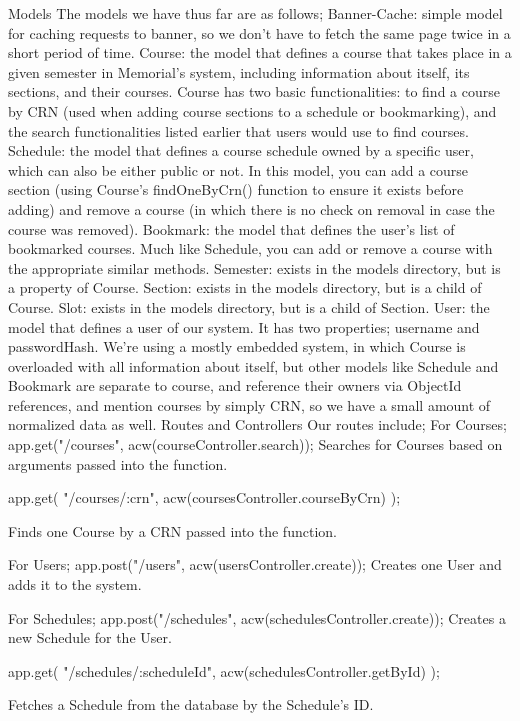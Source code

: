 \documentclass[12pt]{article}
\begin{document}
Models
The models we have thus far are as follows; 
	Banner-Cache: simple model for caching requests to banner, so we don’t have to fetch the same page twice in a short period of time.
	Course: the model that defines a course that takes place in a given semester in Memorial’s system, including information about itself, its sections, and their courses. Course has two basic functionalities: to find a course by CRN (used when adding course sections to a schedule or bookmarking), and the search functionalities listed earlier that users would use to find courses.
	Schedule: the model that defines a course schedule owned by a specific user, which can also be either public or not. In this model, you can add a course section (using Course’s findOneByCrn() function to ensure it exists before adding) and remove a course (in which there is no check on removal in case the course was removed).
	Bookmark: the model that defines the user’s list of bookmarked courses. Much like Schedule, you can add or remove a course with the appropriate similar methods.
	Semester: exists in the models directory, but is a property of Course.
	Section: exists in the models directory, but is a child of Course.
Slot: exists in the models directory, but is a child of Section.
User: the model that defines a user of our system. It has two properties; username and passwordHash.
We’re using a mostly embedded system, in which Course is overloaded with all information about itself, but other models like Schedule and Bookmark are separate to course, and reference their owners via ObjectId references, and mention courses by simply CRN, so we have a small amount of normalized data as well.
	Routes and Controllers
Our routes include;
	For Courses;
app.get("/courses", acw(courseController.search)); 
Searches for Courses based on arguments passed into the function.



app.get(
    "/courses/:crn", 
    acw(coursesController.courseByCrn)
);

Finds one Course by a CRN passed into the function.

	For Users;
	app.post("/users", acw(usersController.create));
Creates one User and adds it to the system.

	For Schedules;
	app.post("/schedules", acw(schedulesController.create));
Creates a new Schedule for the User.
	
app.get(
     "/schedules/:scheduleId", 
     acw(schedulesController.getById)
);

Fetches a Schedule from the database by the Schedule’s ID.
\end{document}
